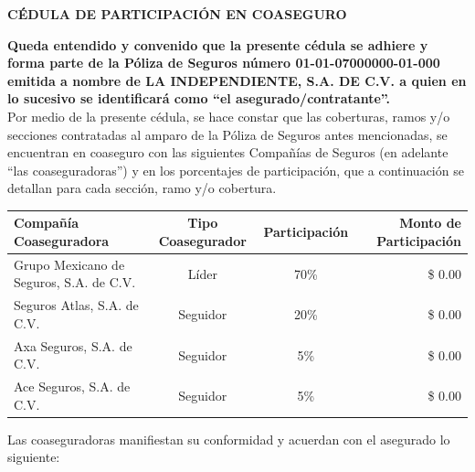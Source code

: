 \documentclass[letterpaper,10pt]{article}
\begin{document}
\begin{center}
    \textbf{CÉDULA DE PARTICIPACIÓN EN COASEGURO}
\end{center}

\textbf{Queda entendido y convenido que la presente cédula se adhiere y forma parte de la Póliza de Seguros número 01-01-07000000-01-000 emitida a nombre de LA INDEPENDIENTE, S.A. DE C.V. a quien en lo sucesivo se identificará como ``el asegurado/contratante''.}\\

Por medio de la presente cédula, se hace constar que las coberturas, ramos y/o secciones contratadas al amparo de la Póliza de Seguros antes mencionadas, se encuentran en coaseguro con las siguientes Compañías de Seguros (en adelante ``las coaseguradoras'') y en los porcentajes de participación, que a continuación se detallan para cada sección, ramo y/o cobertura.

\begin{center}
    \begin{tabu} to \textwidth{|X[l]|c|c|r|}
        \hline
        \textbf{Compañía Coaseguradora} & \textbf{Tipo Coasegurador} & \textbf{Participación} & \textbf{Monto de Participación}\\\hline
        Grupo Mexicano de Seguros, S.A. de C.V. & Líder & 70\% & \$ 0.00\\\hline
        Seguros Atlas, S.A. de C.V. & Seguidor & 20\% & \$ 0.00\\\hline
        Axa Seguros, S.A. de C.V. & Seguidor & 5\% & \$ 0.00\\\hline
        Ace Seguros, S.A. de C.V. & Seguidor & 5\% & \$ 0.00\\
        \hline
    \end{tabu}
\end{center}

Las coaseguradoras manifiestan su conformidad y acuerdan con el asegurado lo siguiente:
\end{document}
